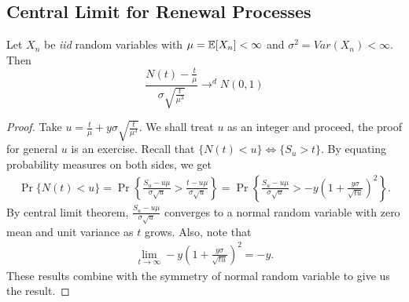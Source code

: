 \documentclass[a4paper,10pt, english]{article}
\begin{document}
\subsection{Central Limit for Renewal Processes}
\begin{thm}
Let $X_n$ be \textit{iid} random variables with $\mu = \mathbb{E}[X_n] < \infty$ and $\sigma^2 = Var(X_n) < \infty$. Then
\[\frac{N(t)-\frac{t}{\mu}}{\sigma \sqrt{\frac{t}{\mu^3}}} \to^d N(0,1) \]
\end{thm}
\begin{proof}
Take $u = \frac{t}{\mu} + y \sigma \sqrt{\frac{t}{\mu^3}}$. We shall treat $u$ as an integer and proceed, the proof for general $u$ is an exercise. Recall that $\{N(t) < u\} \iff \{S_u > t\}$. By equating probability measures on both sides, we get
\begin{align*}
\Pr\{N(t) < u\} = \Pr\left\{\frac{S_u - u\mu}{\sigma \sqrt{u}} > \frac{t - u\mu}{\sigma \sqrt{u}}\right\} = \Pr\left\{\frac{S_u - u\mu}{\sigma \sqrt{u}} > -y\left(1 + \frac{y\sigma}{\sqrt{tu}}\right)^2\right\}.
\end{align*}
By central limit theorem, $\frac{S_u - u\mu}{\sigma \sqrt{u}}$ converges to a normal random variable with zero mean and unit variance as $t$ grows. Also, note that 
\begin{align*}
\lim_{t \to \infty} -y\left(1 + \frac{y\sigma}{\sqrt{tu}}\right)^2 = -y.
\end{align*}
These results combine with the symmetry of normal random variable to give us the result.
\end{proof}
\end{document}
